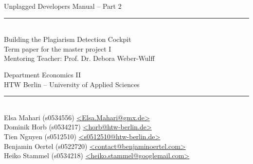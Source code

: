 \begin{titlepage}
\vspace*{2cm}

\begin{center}
\Huge
Unplagged Developers Manual – Part 2\\
\large
\vspace{0.5cm}
\rule[3mm]{1cm}{0.05mm}\\
Building the Plagiarism Detection Cockpit\\
\normalsize
\vfill
Term paper for the master project I \\ Mentoring Teacher: Prof. Dr. Debora Weber-Wulff\\
\vfill

Department Economics II\\
HTW Berlin -- University of Applied Sciences\\

\rule{8.2cm}{0.2mm}\\
Elsa Mahari (s0534556) \href{mailto:elsa.mahari@gmx.de}{\textless Elsa.Mahari@gmx.de\textgreater}\\
Dominik Horb (s0534217) \href{mailto:horb@htw-berlin.de}{\textless horb@htw-berlin.de\textgreater}\\
Tien Nguyen (s0512510) \href{mailto:s0512510@htw-berlin.de}{\textless s0512510@htw-berlin.de\textgreater}\\
Benjamin Oertel (s0522720) \href{mailto:contact@benjaminoertel.com}{\textless contact@benjaminoertel.com\textgreater}\\
Heiko Stammel (s0534218) \href{mailto:heiko.stammel@googlemail.com}{\textless heiko.stammel@googlemail.com\textgreater}\\


\end{center}
\end{titlepage}